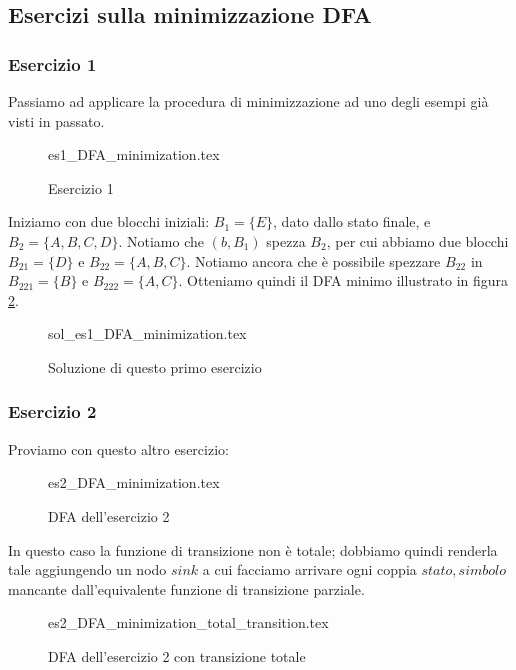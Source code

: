 \documentclass[class=book, crop=false, oneside, 12pt]{standalone}
\begin{document}
\subsection{Esercizi sulla minimizzazione DFA}
\subsubsection{Esercizio 1}
Passiamo ad applicare la procedura di minimizzazione ad uno degli esempi già visti in passato.

\begin{figure}[H]
	\centering
    {es1_DFA_minimization.tex}
	\caption{Esercizio 1}
	\label{mindfa-es-1}
\end{figure}

Iniziamo con due blocchi iniziali: \(B_{1}=\{E\}\), dato dallo stato finale, e \(B_{2}=\{A,B,C,D\}\). Notiamo che \((b,B_{1})\) spezza \(B_{2}\), per cui abbiamo due blocchi \(B_{21}=\{D\}\) e \(B_{22}=\{A,B,C\}\). Notiamo ancora che è possibile spezzare \(B_{22}\) in \(B_{221}=\{B\}\) e \(B_{222}=\{A,C\}\). Otteniamo quindi il DFA minimo illustrato in figura \ref{mindfa-es1-sol}. 

\begin{figure}[H]
	\centering
    {sol_es1_DFA_minimization.tex}
	\caption{Soluzione di questo primo esercizio}
  \label{mindfa-es1-sol}
\end{figure}

\subsubsection{Esercizio 2}
\label{subsec:dfa-minimization}

Proviamo con questo altro esercizio:

\begin{figure}[H]
	\centering
    {es2_DFA_minimization.tex}
	\caption{DFA dell'esercizio 2}
  \label{mindfa-es-2}
\end{figure}

In questo caso la funzione di transizione non è totale; dobbiamo quindi renderla tale aggiungendo un nodo \(sink\) a cui facciamo arrivare ogni coppia \(stato, simbolo\) mancante dall'equivalente funzione di transizione parziale.

\begin{figure}[H]
	\centering
    {es2_DFA_minimization_total_transition.tex}
	\caption{DFA dell'esercizio 2 con transizione totale}
  \label{minndfa-es-2-tot}
\end{figure}
\end{document}
